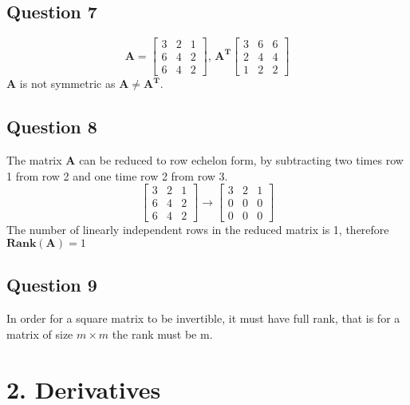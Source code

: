 \documentclass{article}
\begin{document}
\subsection{Question 7}
$$
\mathbf{A} =  
\begin{bmatrix}
3 & 2 & 1 \\
6 & 4 & 2 \\
6 & 4 & 2
\end{bmatrix}
\textbf{, }
\mathbf{A^T}
\begin{bmatrix}
3 & 6 & 6 \\
2 & 4 & 4 \\
1 & 2 & 2
\end{bmatrix}
$$
\textbf{A} is not symmetric as $\mathbf{A} \neq \mathbf{A^T}$.
\subsection{Question 8}
The matrix $ \mathbf{A}$ can be reduced to row echelon form, by subtracting two times row 1 from row 2 and one time row 2 from row 3.
$$
\begin{bmatrix}
3 & 2 & 1 \\
6 & 4 & 2 \\
6 & 4 & 2
\end{bmatrix}
\rightarrow
\begin{bmatrix}
3 & 2 & 1 \\
0 & 0 & 0 \\
0 & 0 & 0
\end{bmatrix}
$$
The number of linearly independent rows in the reduced matrix is 1, therefore $\mathbf{Rank}(\mathbf{A}) = 1$
\subsection{Question 9}
In order for a square matrix to be invertible, it must have full rank, that is for a matrix of size $m \times m$ the rank must be m.
\section{2. Derivatives}
\end{document}
